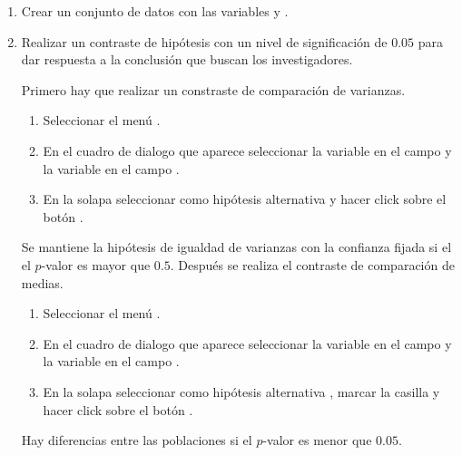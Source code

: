 \begin{enumerate}[leftmargin=*]
\begin{enumerate}
\item Crear un conjunto de datos con las variables  y .

\item Realizar un contraste de hipótesis con un nivel de significación de $0.05$ para dar respuesta a la conclusión que
buscan los investigadores.
\begin{indicacion}
Primero hay que realizar un constraste de comparación de varianzas.
\begin{enumerate}
\item Seleccionar el menú .
\item En el cuadro de dialogo que aparece seleccionar la variable  en el campo  y la
variable  en el campo .
\item En la solapa  seleccionar como hipótesis alternativa  y hacer click
sobre el botón .
\end{enumerate}
Se mantiene la hipótesis de igualdad de varianzas con la confianza fijada si el el $p$-valor es mayor que $0.5$. 
Después se realiza el contraste de comparación de medias.
\begin{enumerate}
\item Seleccionar el menú .
\item En el cuadro de dialogo que aparece seleccionar la variable  en el campo  y la
variable  en el campo .
\item En la solapa  seleccionar como hipótesis alternativa ,
marcar la casilla  y hacer click sobre el botón .
\end{enumerate}
Hay diferencias entre las poblaciones si el $p$-valor es menor que $0.05$.
\end{indicacion}
\end{enumerate}



\end{enumerate}
